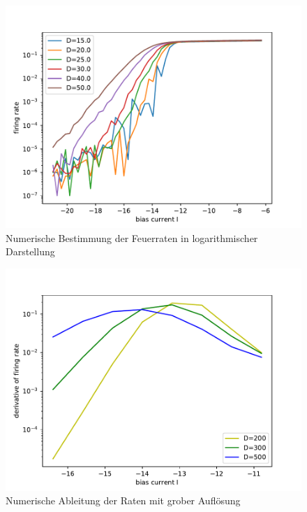 \documentclass[12pt,a4paper]{article}
\begin{document}
\begin{figure}[H]
	\centering
	\includegraphics[scale=1]{firingraterinzelnoiselonglog.pdf}\caption{Numerische Bestimmung der Feuerraten in logarithmischer Darstellung}
	\label{firatenoiselog}
\end{figure}
\begin{figure}[H]
\centering
\includegraphics[scale=1]{drdirinzel.pdf}\caption{Numerische Ableitung der Raten mit grober Auflösung}
\label{drdirin2}
\end{figure}
\end{document}
